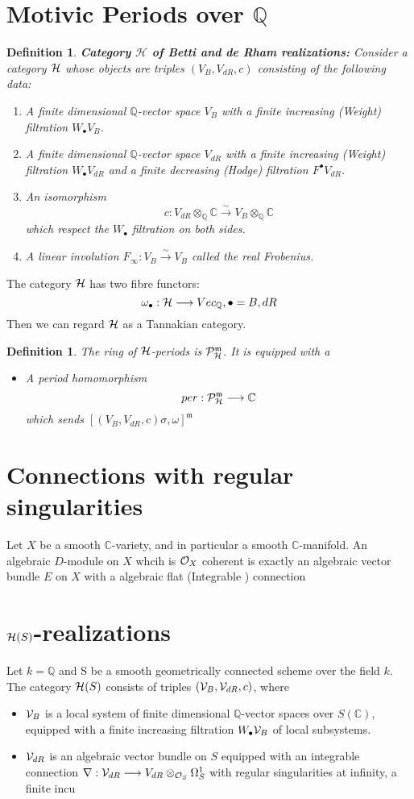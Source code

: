 \documentclass[11pt]{article}
\newtheorem{dfn}[thm]{Definition}
\newcommand{\cplx}{\mathbb C}
\newcommand{\ratl}{\mathbb Q}
\newcommand{\scm}{{\mathfrak m}}
\newcommand{\calh}{{\cal H}}
\newcommand{\calo}{{\cal O}}
\newcommand{\calp}{{\cal P}}
\newcommand{\calv}{{\cal V}}
\newcommand{\lrta}{\longrightarrow}
\begin{document}
\section{Motivic Periods over $\ratl$}
\begin{dfn}
\textbf{Category $\mathcal{H}$ of Betti and de Rham realizations:} Consider a category $\calh$ whose objects are triples $(V_B,V_{dR},c)$ consisting of the following data:
\begin{enumerate}
\item A finite dimensional $\ratl$-vector space $V_B$ with a finite increasing (Weight) filtration $W_\bullet V_B$.
\item A finite dimensional $\ratl$-vector space $V_{dR}$ with a finite increasing (Weight) filtration $W_\bullet V_{dR}$ and a finite decreasing (Hodge) filtration $F^\bullet V_{dR}$.
\item An isomorphism 
$$
c:V_{dR}\otimes_\ratl \cplx\overset{\sim}{\lrta} V_B\otimes_\ratl \cplx
$$
which respect the $W_\bullet$ filtration on both sides.
\item A linear involution $F_\infty: V_B\overset{\sim}{\lrta}V_B$ called the real Frobenius.
\end{enumerate}
\end{dfn}
The category $\calh$ has two fibre functors:
$$
\omega_\bullet:\calh\lrta Vec_\ratl
,\bullet=B,dR
$$
Then we can regard $\calh$ as a Tannakian category.
\begin{dfn}
The ring of $\calh$-periods is ${\cal P}^\scm_\calh$. It is equipped with a 
\begin{itemize}
\item A period homomorphism
$$
per: \calp^\scm_\calh\lrta \cplx
$$
which sends $[(V_B,V_{dR},c)\sigma,\omega]^\scm$
\end{itemize}
\end{dfn}
\section{Connections with regular singularities}
Let $X$ be a smooth $\cplx$-variety, and in particular a smooth $\cplx$-manifold. An algebraic $D$-module on $X$ whcih is $\calo_X$ coherent is exactly an algebraic  vector bundle $E$ on $X$ with a algebraic flat (Integrable ) connection

\section{$\calh(S)$-realizations}
Let $k=\ratl$ and S
 be a smooth geometrically connected scheme over the field $k$. The category $\calh(S)$ consists of triples $(\calv_B,\calv_{dR},c)$, where 
 \begin{itemize}
 	\item $\calv_B$ is a local system of finite dimensional $\ratl$-vector spaces over $S(\cplx)$, equipped with a finite increasing filtration $W_\bullet \calv_B$ of local subsystems.
 	\item $\calv_{dR}$ is an algebraic vector bundle on $S$ equipped with an integrable connection $\nabla:\calv_{dR}\lrta V_{dR}\otimes_{\calo_S}\Omega_S^1$ with regular singularities at infinity, a finite incu
 \end{itemize}
\end{document}
